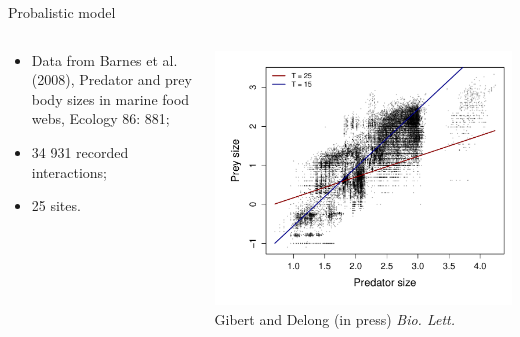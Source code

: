 \documentclass{eecslides}
\begin{document}
	\begin{frame}{Probalistic model}
 	    	\begin{columns}
			\begin{column}{0.35\textwidth}							
				\begin{itemize}
					\item Data from Barnes et al. (2008), Predator and prey body sizes in marine 						food webs, Ecology 86: 881;
					\item 34 931 recorded interactions;
					\item 25 sites.
				\end{itemize}
			\end{column}
			\begin{column}{0.65\textwidth}
				\begin{center}
					\includegraphics[height=0.6\textheight]{PredPreyTemp}\\
					\footnotesize{Gibert and Delong (in press) \textit{Bio. Lett.}}
				\end{center}
			\end{column}				
		\end{columns}	   
	\end{frame}

\end{document}
